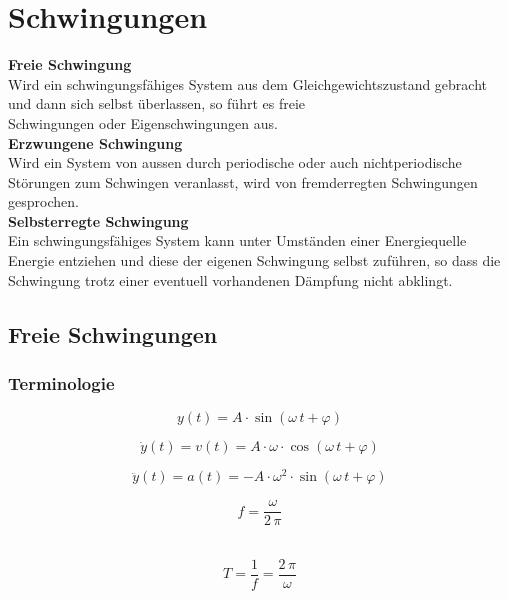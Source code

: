 \section{Schwingungen}

\textbf{Freie Schwingung} \\
Wird ein schwingungsfähiges System aus dem Gleichgewichtszustand gebracht und dann sich
selbst überlassen, so führt es freie \\
Schwingungen oder Eigenschwingungen aus. \\


\textbf{Erzwungene Schwingung} \\
Wird ein System von aussen durch periodische oder auch nichtperiodische Störungen zum
Schwingen veranlasst, wird von fremderregten Schwingungen gesprochen. \\



\textbf{Selbsterregte Schwingung} \\
Ein schwingungsfähiges System kann unter Umständen einer Energiequelle Energie entziehen
und diese der eigenen Schwingung selbst zuführen, so dass die Schwingung trotz einer
eventuell vorhandenen Dämpfung nicht abklingt. 






\subsection{Freie Schwingungen}

\subsubsection{Terminologie}

$$ \boxed{  y(t) = A \cdot \sin(\omega \, t + \varphi) } $$
\begin{minipage}{0.48\linewidth}
$$ \dot{y}(t) =  v(t) = A \cdot \omega \cdot \cos(\omega \, t + \varphi) $$
\end{minipage} 
\hfill
\begin{minipage}{0.48\linewidth}
$$ \ddot{y}(t) = a(t) = - A \cdot \omega^2 \cdot \sin(\omega \, t + \varphi) $$
\end{minipage}

\begin{minipage}{0.48\linewidth}
$$ \boxed{ f = \frac{\omega}{2 \, \pi}  } $$\\
\end{minipage}
\hfill
\begin{minipage}{0.48\linewidth}
$$ \boxed{ T = \frac{1}{f} = \frac{2 \, \pi}{\omega}  } $$ \\
\end{minipage}



